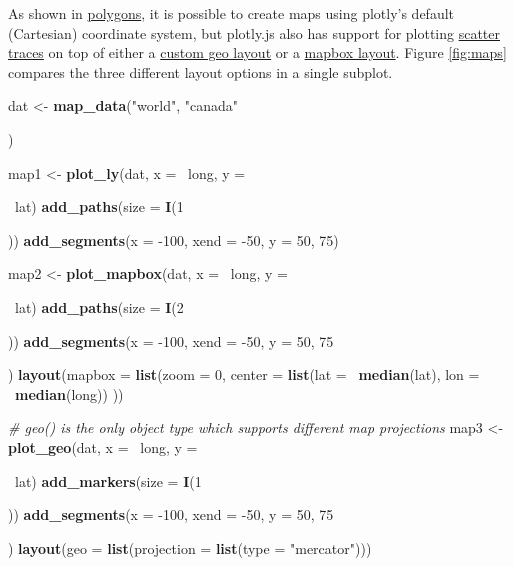 \documentclass[12pt,]{isuthesis}
\newenvironment{Shaded}{\begin{snugshade}}{\end{snugshade}}
\newcommand{\KeywordTok}[1]{\textcolor[rgb]{0.13,0.29,0.53}{\textbf{{#1}}}}
\newcommand{\DataTypeTok}[1]{\textcolor[rgb]{0.13,0.29,0.53}{{#1}}}
\newcommand{\DecValTok}[1]{\textcolor[rgb]{0.00,0.00,0.81}{{#1}}}
\newcommand{\StringTok}[1]{\textcolor[rgb]{0.31,0.60,0.02}{{#1}}}
\newcommand{\CommentTok}[1]{\textcolor[rgb]{0.56,0.35,0.01}{\textit{{#1}}}}
\newcommand{\NormalTok}[1]{{#1}}
\begin{document}
As shown in \protect\hyperlink{polygons}{polygons}, it is possible to
create maps using plotly's default (Cartesian) coordinate system, but
plotly.js also has support for plotting
\protect\hyperlink{scatter-traces}{scatter traces} on top of either a
\href{https://plot.ly/r/reference/\#layout-geo}{custom geo layout} or a
\href{https://plot.ly/r/reference/\#layout-mapbox}{mapbox layout}.
Figure \ref{fig:maps} compares the three different layout options in a
single subplot.

\begin{Shaded}
\begin{Highlighting}[]
\NormalTok{dat <-}\StringTok{ }\KeywordTok{map_data}\NormalTok{(}\StringTok{"world"}\NormalTok{, }\StringTok{"canada"}\NormalTok{) %

\NormalTok{map1 <-}\StringTok{ }\KeywordTok{plot_ly}\NormalTok{(dat, }\DataTypeTok{x =} \NormalTok{~long, }\DataTypeTok{y =} \NormalTok{~lat) %
\StringTok{  }\KeywordTok{add_paths}\NormalTok{(}\DataTypeTok{size =} \KeywordTok{I}\NormalTok{(}\DecValTok{1}\NormalTok{)) %
\StringTok{  }\KeywordTok{add_segments}\NormalTok{(}\DataTypeTok{x =} \NormalTok{-}\DecValTok{100}\NormalTok{, }\DataTypeTok{xend =} \NormalTok{-}\DecValTok{50}\NormalTok{, }\DataTypeTok{y =} \DecValTok{50}\NormalTok{, }\DecValTok{75}\NormalTok{)}

\NormalTok{map2 <-}\StringTok{ }\KeywordTok{plot_mapbox}\NormalTok{(dat, }\DataTypeTok{x =} \NormalTok{~long, }\DataTypeTok{y =} \NormalTok{~lat) %
\StringTok{  }\KeywordTok{add_paths}\NormalTok{(}\DataTypeTok{size =} \KeywordTok{I}\NormalTok{(}\DecValTok{2}\NormalTok{)) %
\StringTok{  }\KeywordTok{add_segments}\NormalTok{(}\DataTypeTok{x =} \NormalTok{-}\DecValTok{100}\NormalTok{, }\DataTypeTok{xend =} \NormalTok{-}\DecValTok{50}\NormalTok{, }\DataTypeTok{y =} \DecValTok{50}\NormalTok{, }\DecValTok{75}\NormalTok{) %
\StringTok{  }\KeywordTok{layout}\NormalTok{(}\DataTypeTok{mapbox =} \KeywordTok{list}\NormalTok{(}\DataTypeTok{zoom =} \DecValTok{0}\NormalTok{,}
      \DataTypeTok{center =} \KeywordTok{list}\NormalTok{(}\DataTypeTok{lat =} \NormalTok{~}\KeywordTok{median}\NormalTok{(lat), }\DataTypeTok{lon =} \NormalTok{~}\KeywordTok{median}\NormalTok{(long))}
   \NormalTok{))}

\CommentTok{# geo() is the only object type which supports different map projections}
\NormalTok{map3 <-}\StringTok{ }\KeywordTok{plot_geo}\NormalTok{(dat, }\DataTypeTok{x =} \NormalTok{~long, }\DataTypeTok{y =} \NormalTok{~lat) %
\StringTok{  }\KeywordTok{add_markers}\NormalTok{(}\DataTypeTok{size =} \KeywordTok{I}\NormalTok{(}\DecValTok{1}\NormalTok{)) %
\StringTok{  }\KeywordTok{add_segments}\NormalTok{(}\DataTypeTok{x =} \NormalTok{-}\DecValTok{100}\NormalTok{, }\DataTypeTok{xend =} \NormalTok{-}\DecValTok{50}\NormalTok{, }\DataTypeTok{y =} \DecValTok{50}\NormalTok{, }\DecValTok{75}\NormalTok{) %
\StringTok{  }\KeywordTok{layout}\NormalTok{(}\DataTypeTok{geo =} \KeywordTok{list}\NormalTok{(}\DataTypeTok{projection =} \KeywordTok{list}\NormalTok{(}\DataTypeTok{type =} \StringTok{"mercator"}\NormalTok{)))}

}}}}}}}}}
\end{Highlighting}
\end{Shaded}
\end{document}
